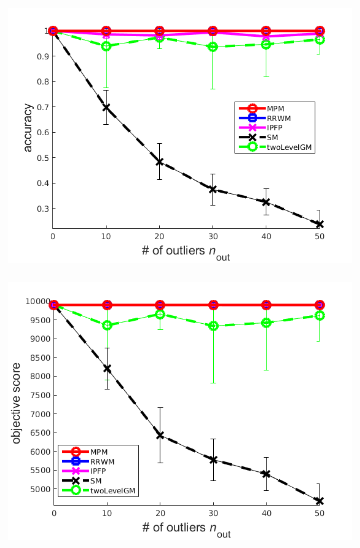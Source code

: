 \begin{figure}
	\begin{subfigure}[b]{0.33\textwidth}
		\centering
		\includegraphics[scale=0.25]{"chapter3/fig/SyntheticTest/no_descr/Results_v4.3.3/Test3/accuracy_avg10t"} 
	\end{subfigure}%
	\begin{subfigure}[b]{0.33\textwidth}
		\centering
		\includegraphics[scale=0.25]{"chapter3/fig/SyntheticTest/no_descr/Results_v4.3.3/Test3/score_avg10t"} 
	\end{subfigure} 
	\begin{subfigure}[b]{0.33\textwidth}
		\centering

\end{subfigure}
\end{figure}
